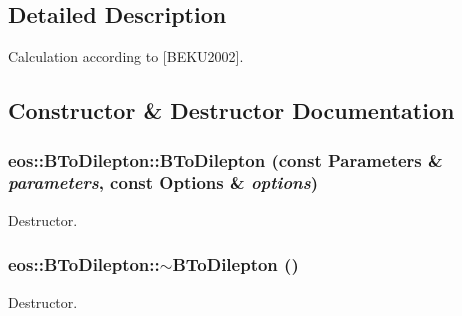 \subsection{Detailed Description}
Calculation according to \mbox{[}BEKU2002\mbox{]}. 

\subsection{Constructor \& Destructor Documentation}
\hypertarget{classeos_1_1BToDilepton_a4e95160c3e54cd1dcb87832c7ccdd15e}{
\subsubsection[{BToDilepton}]{\setlength{\rightskip}{0pt plus 5cm}eos::BToDilepton::BToDilepton (const {\bf Parameters} \& {\em parameters}, \/  const {\bf Options} \& {\em options})}}
\label{classeos_1_1BToDilepton_a4e95160c3e54cd1dcb87832c7ccdd15e}


Destructor. \hypertarget{classeos_1_1BToDilepton_a2a4cc57a5b21d062ecedc52215f03516}{
\subsubsection[{$\sim$BToDilepton}]{\setlength{\rightskip}{0pt plus 5cm}eos::BToDilepton::$\sim$BToDilepton ()}}
\label{classeos_1_1BToDilepton_a2a4cc57a5b21d062ecedc52215f03516}


Destructor. 

